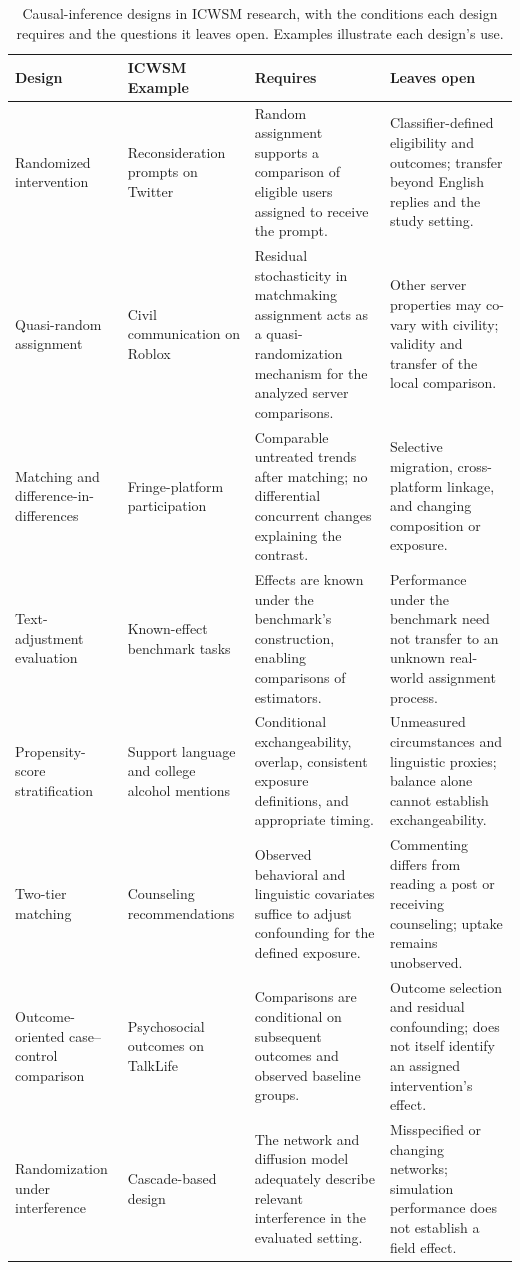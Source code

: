 \begin{table}[t]
\centering
\small
\begin{tabular}{@{}p{}p{}p{}p{}@{}}
\textbf{Design} & \textbf{ICWSM Example} & \textbf{Requires} & \textbf{Leaves open} \\
\toprule
Randomized intervention & Reconsideration prompts on Twitter \citep{p19308} & Random assignment supports a comparison of eligible users assigned to receive the prompt. & Classifier-defined eligibility and outcomes; transfer beyond English replies and the study setting. \\
\hdashline
Quasi-random assignment & Civil communication on Roblox \citep{p31365} & Residual stochasticity in matchmaking assignment acts as a quasi-randomization mechanism for the analyzed server comparisons. & Other server properties may co-vary with civility; validity and transfer of the local comparison. \\
\hdashline
Matching and difference-in-differences & Fringe-platform participation \citep{p22184} & Comparable untreated trends after matching; no differential concurrent changes explaining the contrast. & Selective migration, cross-platform linkage, and changing composition or exposure. \\
\hdashline
Text-adjustment evaluation & Known-effect benchmark tasks \citep{p19362} & Effects are known under the benchmark's construction, enabling comparisons of estimators. & Performance under the benchmark need not transfer to an unknown real-world assignment process. \\
\hdashline
Propensity-score stratification & Support language and college alcohol mentions \citep{p14891,p15012} & Conditional exchangeability, overlap, consistent exposure definitions, and appropriate timing. & Unmeasured circumstances and linguistic proxies; balance alone cannot establish exchangeability. \\
\hdashline
Two-tier matching & Counseling recommendations \citep{p15016} & Observed behavioral and linguistic covariates suffice to adjust confounding for the defined exposure. & Commenting differs from reading a post or receiving counseling; uptake remains unobserved. \\
\hdashline
Outcome-oriented case--control comparison & Psychosocial outcomes on TalkLife \citep{p7326} & Comparisons are conditional on subsequent outcomes and observed baseline groups. & Outcome selection and residual confounding; does not itself identify an assigned intervention's effect. \\
\hdashline
Randomization under interference & Cascade-based design \citep{p31322} & The network and diffusion model adequately describe relevant interference in the evaluated setting. & Misspecified or changing networks; simulation performance does not establish a field effect. \\
\bottomrule
\end{tabular}
\caption{Causal-inference designs in ICWSM research, with the conditions each design requires and the questions it leaves open. Examples illustrate each design's use.}
\label{tab:designs}
\end{table}
